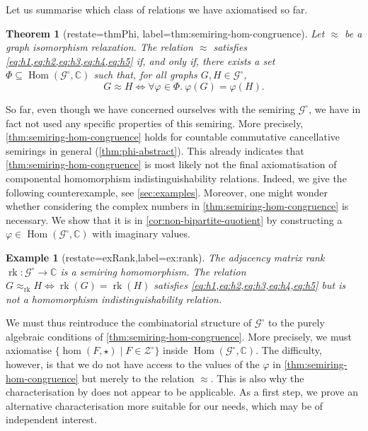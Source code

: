 \documentclass[11pt]{scrartcl}
\theoremstyle{definition}
\theoremstyle{plain}
\newtheorem{example}[definition]{Example}
\newtheorem{theorem}[definition]{Theorem}
\theoremstyle{remark}
\renewcommand\phi\varphi
\DeclareMathOperator\Hom{Hom}
\DeclareMathOperator{\rk}{rk}
\newcommand{\lG}{\mathcal{G}^\circ}
\newcommand{\lZ}{\mathcal{Z}^\circ}
\newcommand{\C}{\mathbb{C}}
\begin{document}
	

	Let us summarise which class of relations we have axiomatised so far.

	\begin{theorem}[restate=thmPhi, label=thm:semiring-hom-congruence]
		Let $\approx$ be a graph isomorphism relaxation.
		The relation $\approx$ satisfies  \cref{eq:h1,eq:h2,eq:h3,eq:h4,eq:h5}
		if, and only if, 
		there exists a set $\Phi \subseteq \Hom(\lG, \mathbb{C})$
		such that, for all graphs $G, H \in \lG$,
		\[
		G \approx H \iff \forall \phi \in \Phi.\ \phi(G) = \phi(H).
		\]
	\end{theorem}

	So far, even though we have concerned ourselves with the semiring $\lG$,
	we have in fact not used any specific properties of this semiring.
	More precisely, \cref{thm:semiring-hom-congruence} holds for countable commutative cancellative semirings in general (\cref{thm:phi-abstract}).
	This already indicates that \cref{thm:semiring-hom-congruence} is most likely not the final axiomatisation of componental homomorphism indistinguishability relations.
	Indeed, we give the following counterexample, see \cref{sec:examples}.
	Moreover, one might wonder whether considering the complex numbers in \cref{thm:semiring-hom-congruence} is necessary.
	We show that it is in \cref{cor:non-bipartite-quotient} by constructing a $\phi \in \Hom(\lG, \C)$ with imaginary values.

	\begin{example}[restate=exRank,label=ex:rank]
		The adjacency matrix rank $\rk \colon \lG \to \mathbb{C}$ is a semiring homomorphism.
		The relation $G \approx_{\rk} H \iff \rk(G) = \rk(H)$ satisfies  \cref{eq:h1,eq:h2,eq:h3,eq:h4,eq:h5}
		but is not a homomorphism indistinguishability relation.
	\end{example}

	We must thus reintroduce the combinatorial structure of $\lG$ to the purely algebraic conditions of \cref{thm:semiring-hom-congruence}.
	More precisely, we must axiomatise $\{\hom(F, \star) \mid F \in \lZ \}$
	inside $\Hom(\lG, \mathbb{C})$.
	The difficulty, however, is that we do not have access to the values of the $\phi$ in \cref{thm:semiring-hom-congruence}
	but merely to the relation $\approx$.
	This is also why the characterisation by \textcite{lovasz_dual_2010}
	does not appear to be applicable.
	As a first step, we prove an alternative characterisation more suitable for our needs, which may be of independent interest.
\end{document}
